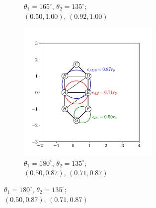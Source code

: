 \begin{figure}[tb]
\begin{subfigure}[b]{0.32\textwidth}
         \caption{$\theta_1=165^\circ$, $\theta_2=135^\circ$; \\$\left(0.50,1.00\right)$, $\left(0.92,1.00\right)$}
         \label{fig:sloct}
     \end{subfigure}
      \hfill
     \begin{subfigure}[b]{0.32\textwidth}
         \centering
         \includegraphics[width=0.75\textwidth]{./figures/ph/sl_oct_b4_180.pdf}
         \caption{$\theta_1=180^\circ$, $\theta_2=135^\circ$; \\$\left(0.50,0.87\right)$, $\left(0.71,0.87\right)$}
         \label{fig:sloct}
     \end{subfigure}
   

\end{figure}
